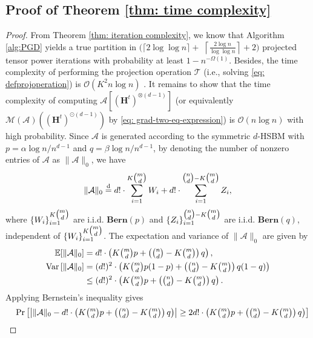 \documentclass{article}
\theoremstyle{plain}
\theoremstyle{definition}
\theoremstyle{remark}
\newcommand{\OCal}{\mathcal{O}}
\newcommand{\MCal}{\mathcal{M}}
\newcommand{\TCal}{\mathcal{T}}
\newcommand{\ACal}{\mathcal{A}}
\begin{document}
\begin{appendix}
\begin{center}
  \section{Proof of Theorem \ref{thm: time complexity}}
    \begin{proof}
			From Theorem \ref{thm: iteration complexity}, we know that Algorithm \ref{alg:PGD} yields a true partition in $\Big(\lceil 2 \log \log n\rceil+$ $\left\lceil\frac{2 \log n}{\log \log n}\right\rceil+2\Big)$ projected tensor power iterations with probability at least $1-n^{-\Omega(1)}$. Besides, the time complexity of performing the projection operation $\TCal$ (i.e., solving \eqref{eq: defprojoperation}) is $\OCal(K^2 n \log n)$ \citep[Proposition 1]{wang2021optimal}. It remains to show that the time complexity of computing $\ACal\left[ \left(\bm{H}^{t} \right)^{\otimes (d-1)}\right]$ (or equivalently $ \MCal(\ACal) \left( (\bm{H}^t)^{\odot (d-1)} \right)$ by \eqref{eq: grad-two-eq-expression}) is $\OCal(n \log n)$ with high probability.
			Since $\mathcal{A}$ is generated according to the symmetric $d$-HSBM with $p=\alpha \log n/ n^{d-1}$ and $q = \beta \log n/ n^{d-1}$, by denoting the number of nonzero entries of $\ACal$ as $\| \ACal\|_0$, we have 
			\begin{equation}
				\|\ACal\|_0 \overset{\textnormal{d}}{=} d! \cdot \sum_{i=1}^{ K \tbinom{m}{d} } W_i + d! \cdot \sum_{i=1}^{\tbinom{n}{d} -K \tbinom{m}{d}} Z_i,
			\end{equation}
			where $\{W_i\}_{i=1}^{ K \tbinom{m}{d}}$ are i.i.d. $\mathbf{Bern}(p)$ and $\{Z_i\}_{i=1}^{\tbinom{n}{d} -K \tbinom{m}{d}}$ are i.i.d. $\mathbf{Bern}(q)$, independent of $\{W_i\}_{i=1}^{K\tbinom{m}{d}}$. The expectation and variance of $\|\ACal\|_0$ are given by
			\begin{align*}
				\mathbb{E}[\|\ACal\|_0] & = d! \cdot \left(K\tbinom{m}{d}p + \left(\tbinom{n}{d} -K \tbinom{m}{d}\right)q \right),\nonumber\\
				{\rm Var}\left[\|\ACal\|_0 \right] &= (d!)^2 \cdot \left(K\tbinom{m}{d}p(1-p) + \left(\tbinom{n}{d} -K \tbinom{m}{d}\right)q(1-q) \right)\\
				& \leq (d!)^2 \cdot \left(K\tbinom{m}{d}p + \left(\tbinom{n}{d} -K \tbinom{m}{d}\right)q \right).
			\end{align*}
			Applying Bernstein's inequality \citep[Theorem 2.8.4]{vershynin2018high} gives
			\begin{align*}
				&\quad \operatorname{Pr} \left[\left|\|\ACal\|_0 - d! \cdot \left(K\tbinom{m}{d}p + \left(\tbinom{n}{d} -K \tbinom{m}{d}\right)q \right) \right|\ge 2d! \cdot \left(K\tbinom{m}{d}p + \left(\tbinom{n}{d} -K \tbinom{m}{d}\right)q \right)\right]\\

\end{align*}
\end{proof}
\end{center}
\end{appendix}
\end{document}
